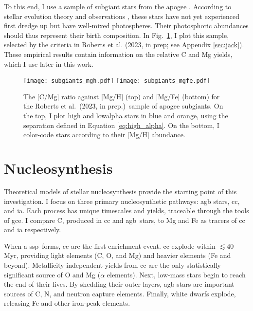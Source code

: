 \documentclass[12pt,oneside,letterpaper]{report}
\newcommand{\cc}{\gls{cc}}
\newcommand{\agb}{\gls{agb}}
\newcommand{\ia}{\gls{ia}}
\newcommand{\ssp}{\gls{ssp}}
\newcommand{\gce}{\gls{gce}}
\newcommand{\apogee}{\gls{apogee}}
\newcommand{\citetjack}{Roberts et al.~(2023, in prep.)}
\begin{document}
To this end, I use a sample of \gls{subgiant} stars from the \apogee{} \citep{apogee17}. According to stellar evolution theory and observations \citep{gilroy89, korn+07, lind+08, souto+18, souto19}, these stars have not yet experienced first dredge up but have well-mixed photospheres. Their photosphoric abundances should thus represent their birth composition.  In Fig.~\ref{fig:subgiants}, I plot this sample, selected by the criteria in Roberts et al. (2023, in prep; see Appendix \ref{sec:jack}). These empirical results contain information on the relative C and Mg yields, which I use later in this work.

\begin{figure}[htp]
    \centering
    \texttt{[image: subgiants\_mgh.pdf]}
    \quad\texttt{[image: subgiants\_mgfe.pdf]}
    \caption[APOGEE Subgiants]{The [C/Mg] ratio against [Mg/H] (top) and [Mg/Fe] (bottom) for the \citetjack~sample of \apogee{} \gls{subgiant}s. On the top, I plot high and \gls{lowalpha} stars in blue and orange, using the separation defined in Equation \ref{eq:high_alpha}. On the bottom, I color-code stars according to their [Mg/H] abundance.}
    \label{fig:subgiants}
\end{figure}








\chapter{Nucleosynthesis}

Theoretical models of stellar \gls{nucleosynthesis} provide the starting point of this investigation. I focus on three primary nucleosynthetic pathways: \agb{} stars, \cc{}, and \ia. Each process has unique timescales and yields, traceable through the tools of \gce. I compare C, produced in \cc{} and \agb\ stars, to Mg and Fe as tracers of \cc{} and \ia{} respectively.

When a \ssp~forms, \cc{} are the first enrichment event. \cc{}  explode within $\lesssim 40$\,Myr, providing light elements (C, O, and Mg) and heavier elements (Fe and beyond). Metallicity-independent yields from \cc{} are the only statistically significant source of O and Mg ($\alpha$ elements). Next, low-mass stars begin to reach the end of their lives. By shedding their outer layers, \agb{} stars are important sources of C, N, and neutron capture elements.  Finally, white dwarfs explode, releasing Fe and other iron-peak elements.
\end{document}
